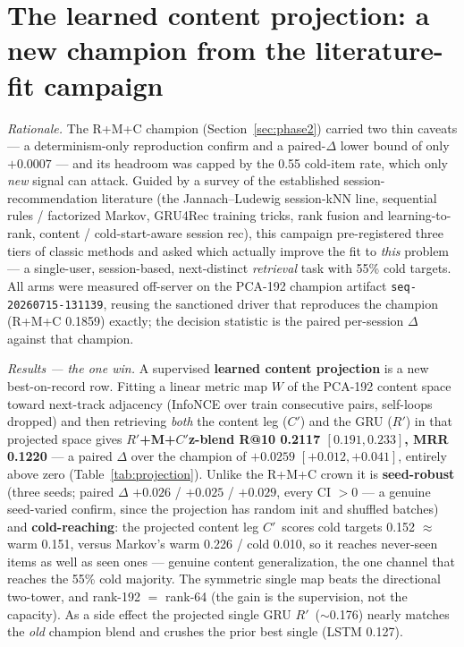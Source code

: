 \documentclass[11pt]{article}
\newcommand{\dsid}[1]{\texttt{\small #1}}
\newcommand{\Rp}{\ensuremath{R'}}
\newcommand{\Cp}{\ensuremath{C'}}
\begin{document}
\section{The learned content projection: a new champion from the literature-fit campaign}
\label{sec:projection}
\emph{Rationale.} The R+M+C champion (Section~\ref{sec:phase2}) carried two thin
caveats --- a determinism-only reproduction confirm and a paired-$\Delta$ lower
bound of only $+\num{0.0007}$ --- and its headroom was capped by the \num{0.55}
cold-item rate, which only \emph{new} signal can attack. Guided by a survey of the
established session-recommendation literature (the Jannach--Ludewig session-kNN
line, sequential rules / factorized Markov, GRU4Rec training tricks, rank fusion
and learning-to-rank, content / cold-start-aware session rec), this campaign
pre-registered three tiers of classic methods and asked which actually improve the
fit to \emph{this} problem --- a single-user, session-based, next-distinct
\emph{retrieval} task with 55\% cold targets. All arms were measured off-server on
the PCA-192 champion artifact \dsid{seq-20260715-131139}, reusing the sanctioned
driver that reproduces the champion (R+M+C \num{0.1859}) exactly; the decision
statistic is the paired per-session $\Delta$ against that champion.

\emph{Results --- the one win.} A supervised \textbf{learned content projection}
is a new best-on-record row. Fitting a linear metric map $W$ of the PCA-192
content space toward next-track adjacency (InfoNCE over train consecutive pairs,
self-loops dropped) and then retrieving \emph{both} the content leg (\Cp) and the
GRU (\Rp) in that projected space gives \textbf{\Rp+M+\Cp z-blend R@10
\num{0.2117} $[0.191, 0.233]$, MRR \num{0.1220}} --- a paired $\Delta$ over the
champion of $+\num{0.0259}$ $[+0.012, +0.041]$, entirely above zero
(Table~\ref{tab:projection}). Unlike the R+M+C crown it is \textbf{seed-robust}
(three seeds; paired $\Delta$ $+\num{0.026}$ / $+\num{0.025}$ / $+\num{0.029}$,
every CI $>0$ --- a genuine seed-varied confirm, since the projection has random
init and shuffled batches) and \textbf{cold-reaching}: the projected content leg
\Cp\ scores cold targets \num{0.152} $\approx$ warm \num{0.151}, versus Markov's
warm \num{0.226} / cold \num{0.010}, so it reaches never-seen items as well as
seen ones --- genuine content generalization, the one channel that reaches the
55\% cold majority. The symmetric single map beats the directional two-tower, and
rank-192 $=$ rank-64 (the gain is the supervision, not the capacity). As a side
effect the projected single GRU \Rp\ ($\sim$\num{0.176}) nearly matches the
\emph{old} champion blend and crushes the prior best single (LSTM \num{0.127}).
\end{document}
